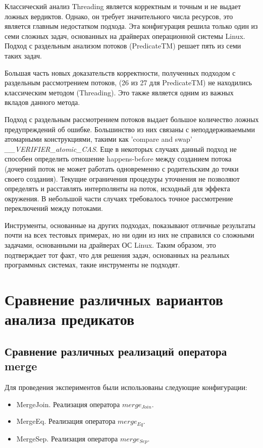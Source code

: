 Классический анализ Threading является корректным и точным и не выдает ложных вердиктов.
Однако, он требует значительного числа ресурсов, это является главным недостатком подхода.
Эта конфигурация решила только один из семи сложных задач, основанных на драйверах операционной системы Linux.
Подход с раздельным анализом потоков (PredicateTM) решает пять из семи таких задач. 

Большая часть новых доказательств корректности, полученных подходом с раздельным рассмотрением потоков, (26 из 27 для PredicateTM) не находились классическим методом (Threading). Это также является одним из важных вкладов данного метода.

Подход с раздельным рассмотрением потоков выдает большое количество ложных предупреждений об ошибке. 
Большинство из них связаны с неподдерживаемыми атомарными конструкциями, такими как 'compare and swap' {\em \_\_VERIFIER\_atomic\_CAS}.
Еще в некоторых случаях данный подход не способен определить отношение happens-before между созданием потока (дочерний поток не может работать одновременно с родительским до точки своего создания).
Текущие ограничения процедуры уточнения не позволяют определять и расставлять интерполянты на поток, исходный для эффекта окружения.
В небольшой части случаях требовалось точное рассмотрение переключений между потоками.

Инструменты, основанные на других подходах, показывают отличные результаты почти на всех тестовых примерах, но ни один из них не справился со сложными задачами, основанными на драйверах ОС Linux. 
Таким образом, это подтверждает тот факт, что для решения задач, основанных на реальных программных системах, такие инструменты не подходят. 

\section{Сравнение различных вариантов анализа предикатов}

\subsection{Сравнение различных реализаций оператора merge}

Для проведения экспериментов были использованы следующие конфигурации:

\begin{itemize}
\item MergeJoin. Реализация оператора $merge_{Join}$.
\item MergeEq. Реализация оператора $merge_{Eq}$.
\item MergeSep. Реализация оператора $merge_{Sep}$.
\end{itemize}

